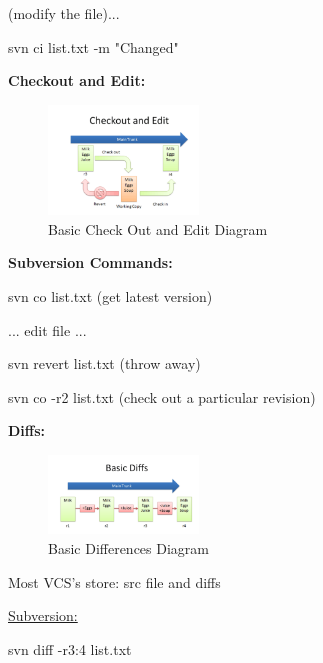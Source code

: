 \documentclass{article}
\begin{document}
\begin{flushleft}
(modify the file)... \par

svn ci list.txt -m "Changed" \\
\par

\textbf{Checkout and Edit:} \\
\par

\begin{figure}[htp]
\centering
\includegraphics[width=4cm]{CheckOutAndEdit.png}
\caption{Basic Check Out and Edit Diagram}
\label{fig:BCOEDiagram}
\end{figure} 

\textbf{Subversion Commands:} \\
\par

svn co list.txt (get latest version) \par
... edit file ... \par
svn revert list.txt (throw away) \par
svn co -r2 list.txt (check out a particular revision) \\
\par

\textbf{Diffs:} \\
\par

\begin{figure}[htp]
\centering
\includegraphics[width=4cm]{Diff.png}
\caption{Basic Differences Diagram}
\label{fig:BDDiagram}
\end{figure} 

Most VCS's store: src file and diffs

\underline{Subversion:} \\
\par

svn diff -r3:4 list.txt \\
\par


\end{flushleft}
\end{document}

